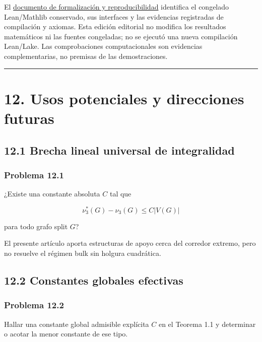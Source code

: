 \documentclass[spanish,11pt,a4paper]{article}
\begin{document}
El
\href{https://github.com/jtraverso/erdos-81-chordal-clique-partitions/blob/main/preprints/PAPER_III/05_formalization/FORMALIZATION_COMPANION_v1.6_es.pdf}{documento
de formalización y reproducibilidad} identifica el congelado
Lean/Mathlib conservado, sus interfaces y las evidencias registradas de
compilación y axiomas. Esta edición editorial no modifica los resultados
matemáticos ni las fuentes congeladas; no se ejecutó una nueva
compilación Lean/Lake. Las comprobaciones computacionales son evidencias
complementarias, no premisas de las demostraciones.

\begin{center}\rule{0.5\linewidth}{0.5pt}\end{center}

\section{12. Usos potenciales y direcciones
futuras}\label{usos-potenciales-y-direcciones-futuras}

\subsection{12.1 Brecha lineal universal de
integralidad}\label{brecha-lineal-universal-de-integralidad}

\subsubsection{Problema 12.1}\label{problema-12.1}

¿Existe una constante absoluta \(C\) tal que

\[
\nu_3^*(G)-\nu_3(G)
\le C|V(G)|
\]

para todo grafo split \(G\)?

El presente artículo aporta estructuras de apoyo cerca del corredor
extremo, pero no resuelve el régimen bulk sin holgura cuadrática.

\subsection{12.2 Constantes globales
efectivas}\label{constantes-globales-efectivas}

\subsubsection{Problema 12.2}\label{problema-12.2}

Hallar una constante global admisible explícita \(C\) en el Teorema 1.1
y determinar o acotar la menor constante de ese tipo.
\end{document}
